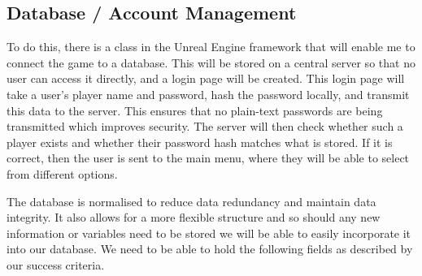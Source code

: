 \subsection{Database / Account Management}

To do this, there is a class in the Unreal Engine framework that will enable me to connect the game to a database. This will be stored on a central server so that no user can access it directly, and a login page will be created. This login page will take a user's player name and password, hash the password locally, and transmit this data to the server. This ensures that no plain-text passwords are being transmitted which improves security. The server will then check whether such a player exists and whether their password hash matches what is stored. If it is correct, then the user is sent to the main menu, where they will be able to select from different options.


\vs
The database is normalised to reduce data redundancy and maintain data integrity. It also allows for a more flexible structure and so should any new information or variables need to be stored we will be able to easily incorporate it into our database. We need to be able to hold the following fields as described by our success criteria.


